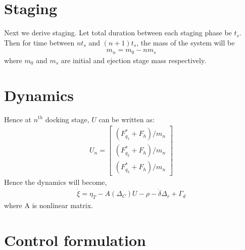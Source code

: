 \documentclass[]{article}
\theoremstyle{remark}
\theoremstyle{definition}
\begin{document}
	\section{Staging}
	Next we derive staging. Let total duration between each staging phase be $t_s$. Then for time between $nt_s$ and $(n+1)t_s$, the mass of the system will be 
	\begin{align}
		m_n = m_0 - nm_s 
	\end{align}
	where $m_0$ and $m_s$ are initial and ejection stage mass respectively.
	\section{Dynamics}
	Hence at $n^{th}$ docking stage, $U$ can be written as:
	\begin{align}
		U_n = \begin{bmatrix}
			(F^*_{q_1}+F_h)/m_n \\ (F^*_{q_2}+F_h)/m_n \\
			(F^*_{q_3}+F_h)/m_n
		\end{bmatrix}
	\end{align}
	Hence the dynamics will become,
	\begin{align}
		\dot \xi =  \eta_T -  A(\Delta_C)U-\rho - \dot \delta \Delta_r + \Gamma_d   
	\end{align}
	where A is nonlinear matrix. 
	\section{Control formulation}
\end{document}
